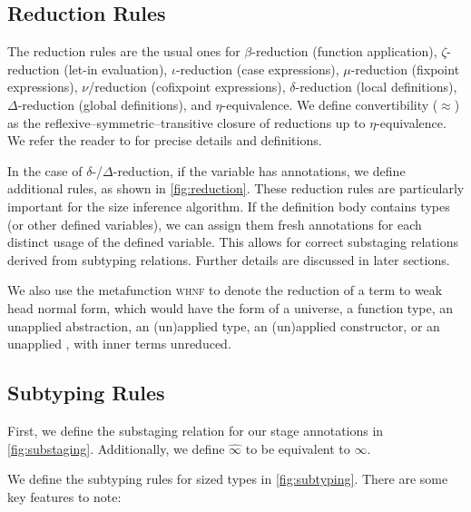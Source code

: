 \documentclass[sigplan,10pt,anonymous,review]{acmart}
\begin{document}
\subsection{Reduction Rules}



The reduction rules are the usual ones for $\beta$-reduction (function application), $\zeta$-reduction (let-in evaluation), $\iota$-reduction (case expressions), $\mu$-reduction (fixpoint expressions), $\nu$\-/reduction (cofixpoint expressions), $\delta$-reduction (local definitions), $\Delta$-reduction (global definitions), and $\eta$-equivalence. We define convertibility ($\approx$) as the reflexive--symmetric--transitive closure of reductions up to $\eta$-equivalence. We refer the reader to \cite{cic-hat-bar, cic-hat, cc-hat-omega, coq} for precise details and definitions.

In the case of $\delta$-/$\Delta$-reduction, if the variable has annotations, we define additional rules, as shown in \autoref{fig:reduction}. These reduction rules are particularly important for the size inference algorithm. If the definition body contains \coinductive types (or other defined variables), we can assign them fresh annotations for each distinct usage of the defined variable. This allows for correct substaging relations derived from subtyping relations. Further details are discussed in later sections.

We also use the metafunction \textsc{whnf} to denote the reduction of a term to weak head normal form, which would have the form of a universe, a function type, an unapplied abstraction, an (un)applied \coinductive type, an (un)applied constructor, or an unapplied \cofixpoint, with inner terms unreduced.

\subsection{Subtyping Rules}



First, we define the substaging relation for our stage annotations in \autoref{fig:substaging}. Additionally, we define $\widehat{\infty}$ to be equivalent to $\infty$.



We define the subtyping rules for sized types in \autoref{fig:subtyping}. There are some key features to note:
\end{document}

